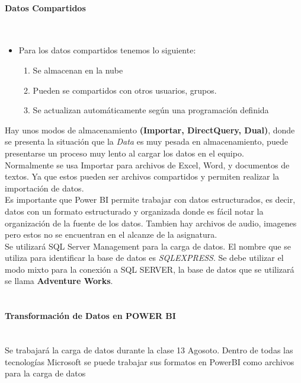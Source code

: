 \documentclass[a4paper]{report} %
\begin{document}
            \paragraph{Datos Compartidos}\mbox{} \\
              \begin{itemize}
                \item Para los datos compartidos tenemos lo siguiente:
                  \begin{enumerate}
                    \item Se almacenan en la nube
                    \item Pueden se compartidos con otros usuarios, grupos.
                    \item Se actualizan automáticamente según una programación definida
                  \end{enumerate}
              \end{itemize}
              Hay unos modos de almacenamiento \textbf{(Importar, DirectQuery, Dual)}, donde se presenta la situación que la \textit{Data} es muy pesada en almacenamiento, puede presentarse un proceso muy lento al cargar los datos en el equipo.
              \\Normalmente se usa Importar para archivos de Excel, Word, y documentos de textos. Ya que estos pueden ser archivos compartidos y permiten realizar la importación de datos.
              \\Es importante que Power BI permite trabajar con datos estructurados, es decir, datos con un formato estructurado y organizada donde es fácil notar la organización de la fuente de los datos. Tambien hay archivos de audio, imagenes pero estos no se encuentran en el alcanze de la asignatura.
              \\Se utilizará SQL Server Management para la carga de datos. El nombre que se utiliza para identificar la base de datos es \textit{SQLEXPRESS}. Se debe utilizar el modo mixto para la conexión a SQL SERVER, la base de datos que se utilizará se llama \textbf{Adventure Works}. 
              \\\\\paragraph{Transformación de Datos en POWER BI}\mbox{}\\
              Se trabajará la carga de datos durante la clase 13 Agosoto. Dentro de todas las tecnologías Microsoft se puede trabajar sus formatos en PowerBI como archivos para la carga de datos
\end{document}
